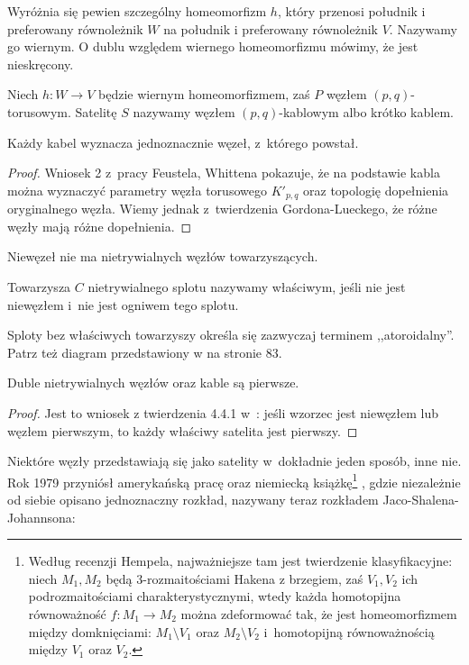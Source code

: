 Wyróżnia się pewien szczególny homeomorfizm $h$, który przenosi południk i preferowany równoleżnik $W$ na południk i preferowany równoleżnik $V$.
Nazywamy go wiernym.
O dublu względem wiernego homeomorfizmu mówimy, że jest nieskręcony.

\begin{definition}
    Niech $h \colon W \to V$ będzie wiernym homeomorfizmem, zaś $P$ węzłem $(p, q)$-torusowym.
    Satelitę $S$ nazywamy węzłem $(p, q)$-kablowym albo krótko kablem.
\end{definition}

\begin{proposition}
    Każdy kabel wyznacza jednoznacznie węzeł, z~którego powstał.
\end{proposition}

\begin{proof}
    Wniosek 2 z~pracy \cite{feustel78} Feustela, Whittena pokazuje, że na podstawie kabla można wyznaczyć parametry węzła torusowego $K'_{p,q}$ oraz topologię dopełnienia oryginalnego węzła.
    Wiemy jednak z~twierdzenia Gordona-Lueckego, że różne węzły mają różne dopełnienia.
\end{proof}

Niewęzeł nie ma nietrywialnych węzłów towarzyszących.

\begin{definition}
    Towarzysza $C$ nietrywialnego splotu nazywamy właściwym, jeśli nie jest niewęzłem i~nie jest ogniwem tego splotu.
\end{definition}

Sploty bez właściwych towarzyszy określa się zazwyczaj terminem ,,atoroidalny''.
Patrz też diagram przedstawiony w \cite{cromwell04} na stronie 83.

\begin{proposition}
    Duble nietrywialnych węzłów oraz kable są pierwsze.
\end{proposition}

\begin{proof}
    Jest to wniosek z twierdzenia 4.4.1 w~\cite{cromwell04}: jeśli wzorzec jest niewęzłem lub węzłem pierwszym, to każdy właściwy satelita jest pierwszy.
\end{proof}

Niektóre węzły przedstawiają się jako satelity w~dokładnie jeden sposób, inne nie.
Rok 1979 przyniósł amerykańską pracę \cite{jaco79} oraz niemiecką książkę\footnote{Według recenzji Hempela, najważniejsze tam jest twierdzenie klasyfikacyjne: niech $M_1, M_2$ będą 3-rozmaitościami Hakena z brzegiem, zaś $V_1, V_2$ ich podrozmaitościami charakterystycznymi, wtedy każda homotopijna równoważność $f \colon M_1 \to M_2$ można zdeformować tak, że jest homeomorfizmem między domknięciami: $M_1 \setminus V_1$ oraz $M_2 \setminus V_2$ i~homotopijną równoważnością między $V_1$ oraz $V_2$.} \cite{johannson79}, gdzie niezależnie od siebie opisano jednoznaczny rozkład, nazywany teraz rozkładem Jaco-Shalena-Johannsona:

